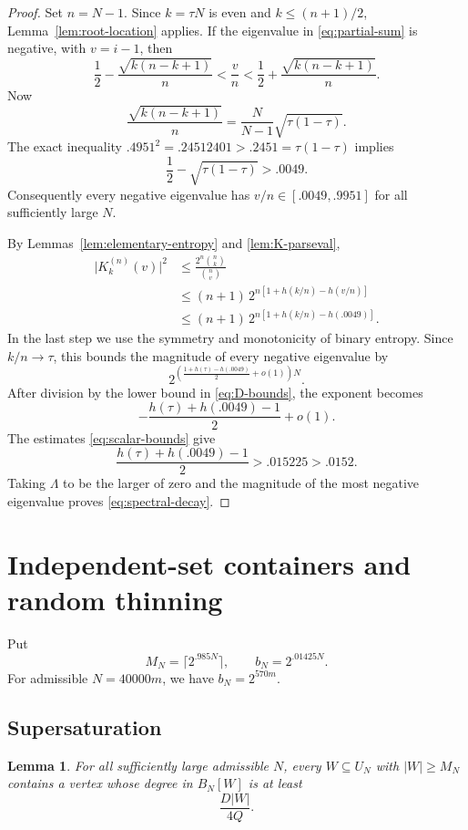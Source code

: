 \documentclass[11pt,leqno]{amsart}
\numberwithin{equation}{section}
\newtheorem{lemma}[theorem]{Lemma}
\theoremstyle{definition}
\theoremstyle{remark}
\newcommand{\abs}[1]{\lvert#1\rvert}
\newcommand{\ceil}[1]{\lceil#1\rceil}
\begin{document}
\begin{proof}
Set $n=N-1$. Since $k=\tau N$ is even and $k\le(n+1)/2$, Lemma~\ref{lem:root-location} applies. If the eigenvalue in \eqref{eq:partial-sum} is negative, with $v=i-1$, then
\[
 \frac12-\frac{\sqrt{k(n-k+1)}}n
 <\frac vn<
 \frac12+\frac{\sqrt{k(n-k+1)}}n.
\]
Now
\[
 \frac{\sqrt{k(n-k+1)}}n
 =\frac{N}{N-1}\sqrt{\tau(1-\tau)}.
\]
The exact inequality $.4951^2=.24512401>.2451=\tau(1-\tau)$ implies
\[
 \frac12-\sqrt{\tau(1-\tau)}>.0049.
\]
Consequently every negative eigenvalue has $v/n\in[.0049,.9951]$ for all sufficiently large $N$.

By Lemmas~\ref{lem:elementary-entropy} and \ref{lem:K-parseval},
\begin{align*}
 \abs{K_k^{(n)}(v)}^2
 &\le \frac{2^n\binom nk}{\binom nv}\\
 &\le(n+1)\,2^{n[1+h(k/n)-h(v/n)]}\\
 &\le(n+1)\,2^{n[1+h(k/n)-h(.0049)]}.
\end{align*}
In the last step we use the symmetry and monotonicity of binary entropy. Since $k/n\to\tau$, this bounds the magnitude of every negative eigenvalue by
\[
 2^{\left(\frac{1+h(\tau)-h(.0049)}2+o(1)\right)N}.
\]
After division by the lower bound in \eqref{eq:D-bounds}, the exponent becomes
\[
 -\frac{h(\tau)+h(.0049)-1}{2}+o(1).
\]
The estimates \eqref{eq:scalar-bounds} give
\[
 \frac{h(\tau)+h(.0049)-1}{2}>.015225>.0152.
\]
Taking $\Lambda$ to be the larger of zero and the magnitude of the most negative eigenvalue proves \eqref{eq:spectral-decay}.
\end{proof}

\section{Independent-set containers and random thinning}

Put
\begin{equation}\label{eq:container-parameters}
 M_N=\ceil{2^{.985N}},\qquad
 b_N=2^{.01425N}.
\end{equation}
For admissible $N=40000m$, we have $b_N=2^{570m}$.

\subsection{Supersaturation}

\begin{lemma}\label{lem:supersaturation}
For all sufficiently large admissible $N$, every $W\subseteq U_N$ with $\abs W\ge M_N$ contains a vertex whose degree in $B_N[W]$ is at least
\begin{equation}\label{eq:large-degree}
 \frac{D\abs W}{4Q}.
\end{equation}
\end{lemma}
\end{document}
